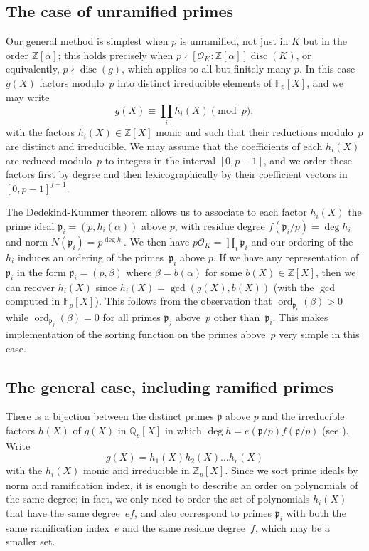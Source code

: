 \documentclass{article}
\def\Z{{\mathbb Z}}
\def\Q{{\mathbb Q}}
\def\F{{\mathbb F}}
\def\Fp{{\mathbb F}_p}
\def\OO{{\mathcal O}}
\def\p{{\mathfrak p}}
\DeclareMathOperator{\disc}{disc}
\DeclareMathOperator{\ord}{ord}
\begin{document}
\subsection{The case of unramified primes}

Our general method is simplest when $p$ is unramified, not just in $K$
but in the order $\Z[\alpha]$; this holds precisely when $p\nmid
[\OO_K:\Z[\alpha]]\disc(K)$, or equivalently, $p\nmid\disc(g)$, which
applies to all but finitely many $p$.  In this case $g(X)$ factors
modulo~$p$ into distinct irreducible elements of $\Fp[X]$, and we may
write
\[
    g(X) \equiv \prod_i h_i(X) \pmod{p},
\]
with the factors $h_i(X)\in\Z[X]$ monic and such that their reductions
modulo~$p$ are distinct and irreducible.  We may assume that the
coefficients of each $h_i(X)$ are reduced modulo~$p$ to integers in the interval $[0,p-1]$, and we order these factors first by degree and then lexicographically by their coefficient vectors in $[0,p-1]^{f+1}$.

The Dedekind-Kummer theorem allows us to associate to each factor
$h_i(X)$ the prime ideal $\p_i=(p,h_i(\alpha))$ above $p$, with
residue degree $f(\p_i/p)=\deg h_i$ and norm $N(\p_i)=p^{\deg h_i}$.
We then have $p\OO_K=\prod_i \p_i$ and our ordering of the $h_i$
induces an ordering of the primes~$\p_i$ above $p$.  If we have any
representation of $\p_i$ in the form $\p_i=(p,\beta)$ where
$\beta=b(\alpha)$ for some $b(X)\in\Z[X]$, then we can recover
$h_i(X)$ since $h_i(X)=\gcd(g(X),b(X))$ (with the $\gcd$ computed in
$\F_p[X]$).  This follows from the observation that
$\ord_{\p_i}(\beta)>0$ while $\ord_{\p_j}(\beta)=0$ for all primes
$\p_j$ above~$p$ other than~$\p_i$.  This makes implementation of the
sorting function on the primes above~$p$ very simple in this case.

\subsection{The general case, including ramified primes}

There is a bijection between the distinct primes $\p$ above $p$ and
the irreducible factors $h(X)$ of $g(X)$ in $\Q_p[X]$ in which $\deg h
= e(\p/p)f(\p/p)$ (see \cite[Theorem 3.8 (d)]{Janusz}).  Write
\[
  g(X) = h_1(X)h_2(X)\dots h_r(X)
\]
with the $h_i(X)$ monic and irreducible in $\Z_p[X]$. Since we sort
prime ideals by norm and ramification index, it is enough to describe
an order on polynomials of the same degree; in fact, we only need to
order the set of polynomials $h_i(X)$ that have the same degree~$ef$,
and also correspond to primes $\p_i$ with both the same ramification
index~$e$ and the same residue degree~$f$, which may be a smaller set.
\end{document}
